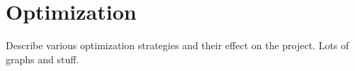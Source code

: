 \section{Optimization}
Describe various optimization strategies and their effect on the project. Lots of graphs and stuff.